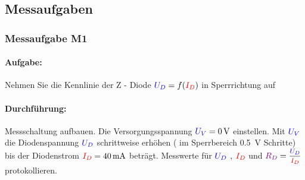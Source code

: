 \documentclass[11pt,a4paper,titlepage]{scrreprt}
\begin{document}
          \subsection{Messaufgaben}
            \subsubsection{Messaufgabe M1}
              \paragraph{Aufgabe:} Nehmen Sie die Kennlinie der Z - Diode $\textcolor{blue}{U_D} = f(\textcolor{red}{I_D})$ in Sperrrichtung auf
              \paragraph{Durchführung:}  Messschaltung aufbauen. Die Versorgungsspannung $\textcolor{blue}{U_V} = \SI{0}{\volt}$ einstellen. Mit $\textcolor{blue}{U_V}$ die Diodenspannung $\textcolor{blue}{U_D}$ schrittweise erhöhen ( im Sperrbereich \SI{0,5}{\volt} Schritte) bis der Diodenstrom $\textcolor{red}{I_D} = \SI{40}{\milli\ampere}$ beträgt. Messwerte für $\textcolor{blue}{U_D}$ , $\textcolor{red}{I_D}$ und $\widerstand{R_D} = \mfrac{\spannung{U_D}}{\strom{I_D}}$ protokollieren.
\end{document}
